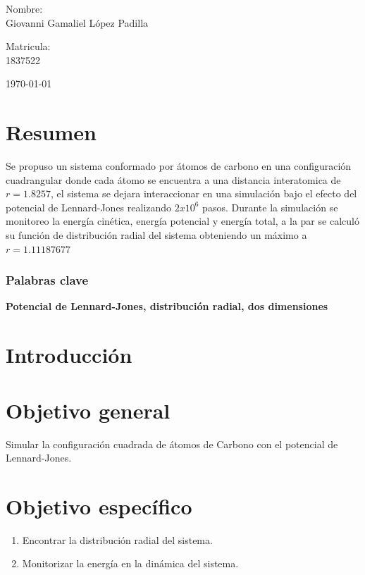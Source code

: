 \documentclass[12pt,letterpaper]{article}
\begin{document}
\begin{titlepage}
\begin{center}
\begin{minipage}{0.6\linewidth}
\vspace{0.5cm}
\changefontsizes{14pt}
Nombre:\\
Giovanni Gamaliel López Padilla\\
\end{minipage}
\begin{minipage}{0.2\linewidth}
\changefontsizes{14pt}
Matricula:\\
1837522
\end{minipage}
\end{center}
\vspace{4cm}
\begin{flushright}
\today
\end{flushright}
\end{titlepage}
\begin{multicols}{2}
\section*{Resumen}
Se propuso un sistema conformado por átomos de carbono en una configuración cuadrangular donde cada átomo se encuentra a una distancia interatomica de $r=1.8257$, el sistema se dejara interaccionar en una simulación bajo el efecto del potencial de Lennard-Jones realizando $2x10^{6}$ pasos. Durante la simulación se monitoreo la energía cinética, energía potencial y energía total, a la par se calculó su función de distribución radial del sistema obteniendo un máximo a $r=1.11187677$
\subsubsection*{Palabras clave}
\textbf{Potencial de Lennard-Jones, distribución radial, dos dimensiones}
\section*{Introducción}

\section*{Objetivo general}
Simular la configuración cuadrada de átomos de Carbono con el potencial de Lennard-Jones.
\section*{Objetivo específico}
\begin{enumerate}
    \item Encontrar la distribución radial del sistema.
    \item Monitorizar la energía en la dinámica del sistema.
\end{enumerate}

\end{multicols}
\end{document}
